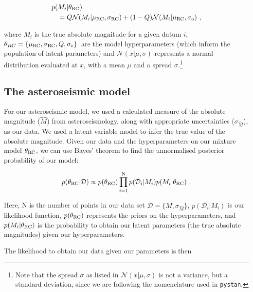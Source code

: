 \documentclass[fleqn,usenatbib]{mnras}
\newcommand{\up}[1]{#1}
\begin{document}
\begin{equation}\label{eq:pMi}
\begin{split}
p(&M_i | \theta_{\rm RC}) \\
&=  Q\mathcal{N}(M_i | \mu_{\rm RC}, \sigma_{\rm RC}) +  (1-Q)\mathcal{N}(M_i | \mu_{\rm RC}, \sigma_{\rm o})\ ,
\end{split}
\end{equation}

\noindent where $M_i$ is the true absolute magnitude for a given datum $i$, $\theta_{RC} = \{\mu_{\rm RC}, \sigma_{\rm RC}, Q, \sigma_{\rm o}\}$\ are the model hyperparameters (which inform the population of latent parameters) and $\mathcal{N}(x|\mu, \sigma)$ represents a normal distribution evaluated at $x$, with a mean $\mu$ and a spread $\sigma$.\footnote{Note that the spread $\sigma$ as listed in $\mathcal{N}(x|\mu, \sigma)$ is not a variance, but a standard deviation, since we are following the nomenclature used in \texttt{pystan}.}

\subsection{The asteroseismic model}
For our asteroseismic model, we used a calculated measure of the absolute magnitude ($\hat{M}$) from asteroseismology, along with appropriate uncertainties ($\sigma_{\hat{M}}$), as our data. We used a latent variable model to infer the true value of the absolute magnitude. Given our data and the hyperparameters on our mixture model $\theta_{\rm RC}$, we can use Bayes' theorem to find the unnormalised posterior probability of our model:

\begin{equation}\label{eq:postprob_ast}
\begin{split}
p(\theta_{\rm RC} | \mathcal{D}) \propto  p(\theta_{\rm RC}) \prod_{i=1}^{\rm N} p(\mathcal{D}_i | M_i)p(M_i | \theta_{\rm RC})\ .
\end{split}
\end{equation}

\noindent Here, N is the number of points in our data set $\mathcal{D} = \{\hat{M}, \sigma_{\hat{M}}\}$, $p(\mathcal{D}_i | M_i)$ is our likelihood function, $p(\theta_{\rm RC})$ represents the priors on the hyperparameters, and $p(M_i | \theta_{\rm RC})$ is the probability to obtain our latent parameters \up{(the true absolute magnitudes)} given our hyperparameters. 

The likelihood to obtain our data given our parameters is then
\end{document}

